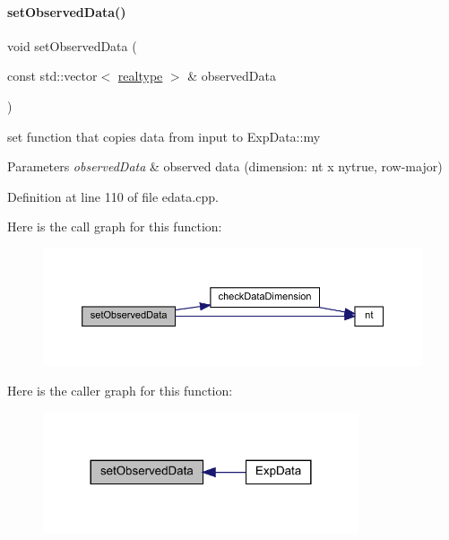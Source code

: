 \paragraph{\texorpdfstring{set\+Observed\+Data()}{setObservedData()}\hspace{0.1cm}{\footnotesize\ttfamily [1/2]}}
{\footnotesize\ttfamily void set\+Observed\+Data (\begin{DoxyParamCaption}\item[{const std\+::vector$<$ \mbox{\hyperlink{namespaceamici_a1bdce28051d6a53868f7ccbf5f2c14a3}{realtype}} $>$ \&}]{observed\+Data }\end{DoxyParamCaption})}

set function that copies data from input to Exp\+Data\+::my


\begin{DoxyParams}{Parameters}
{\em observed\+Data} & observed data (dimension\+: nt x nytrue, row-\/major) \\
\hline
\end{DoxyParams}


Definition at line 110 of file edata.\+cpp.

Here is the call graph for this function\+:
\nopagebreak
\begin{figure}[H]
\begin{center}
\leavevmode
\includegraphics[width=350pt]{classamici_1_1_exp_data_a85ca23791c279fe94e5d9f8e528ca63e_cgraph}
\end{center}
\end{figure}
Here is the caller graph for this function\+:
\nopagebreak
\begin{figure}[H]
\begin{center}
\leavevmode
\includegraphics[width=264pt]{classamici_1_1_exp_data_a85ca23791c279fe94e5d9f8e528ca63e_icgraph}
\end{center}
\end{figure}
\mbox{\label{classamici_1_1_exp_data_a814827d61da6c675276758c856faf794}} 
